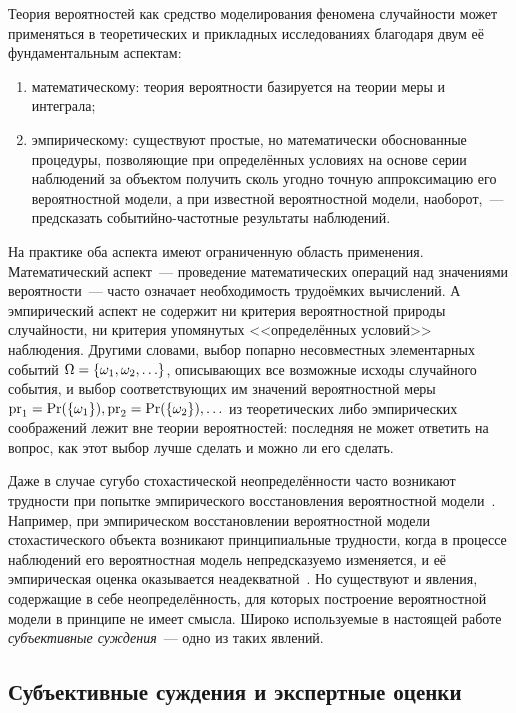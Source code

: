 Теория вероятностей как средство моделирования феномена случайности может применяться в теоретических и прикладных исследованиях благодаря двум её фундаментальным аспектам:
\begin{enumerate}
  \item математическому: теория вероятности базируется на теории меры и интеграла;
  \item эмпирическому: существуют простые, но математически обоснованные процедуры, позволяющие при определённых условиях
на основе серии наблюдений за объектом получить сколь угодно точную аппроксимацию его вероятностной модели, а при известной вероятностной модели, наоборот,~--- предсказать событийно-частотные результаты наблюдений. 
\end{enumerate}

На практике оба аспекта имеют ограниченную область применения. Математический аспект~--- проведение математических операций над значениями вероятности~--- часто означает необходимость трудоёмких вычислений. А эмпирический аспект не содержит ни критерия вероятностной природы случайности, ни критерия упомянутых <<определённых условий>> наблюдения. Другими словами, выбор попарно несовместных элементарных событий $\Omega = \{\omega_1, \omega_2, \ldots\}$, описывающих все возможные исходы случайного события, и выбор соответствующих им значений вероятностной меры ${\mathrm{pr}}_1 = {\mathrm{Pr}}(\{\omega_1\}), {\mathrm{pr}}_2 = {\mathrm{Pr}}(\{\omega_2\}), \ldots$ из теоретических либо эмпирических соображений лежит вне теории вероятностей: последняя не может ответить на вопрос, как этот выбор лучше сделать и можно ли его сделать.

Даже в случае сугубо стохастической неопределённости часто возникают трудности при попытке эмпирического восстановления вероятностной модели~\cite{pytstrange}. Например, при эмпирическом восстановлении вероятностной модели стохастического объекта возникают принципиальные трудности, когда в процессе наблюдений его вероятностная модель непредсказуемо изменяется, и её эмпирическая оценка оказывается неадекватной~\cite{pyt2013}. Но существуют и явления, содержащие в себе неопределённость, для которых построение вероятностной модели в принципе не имеет смысла. Широко используемые в настоящей работе {\sl субъективные суждения}~--- одно из таких явлений. 

\subsection{Субъективные суждения и экспертные оценки}
\label{sec:intro_subjective}

